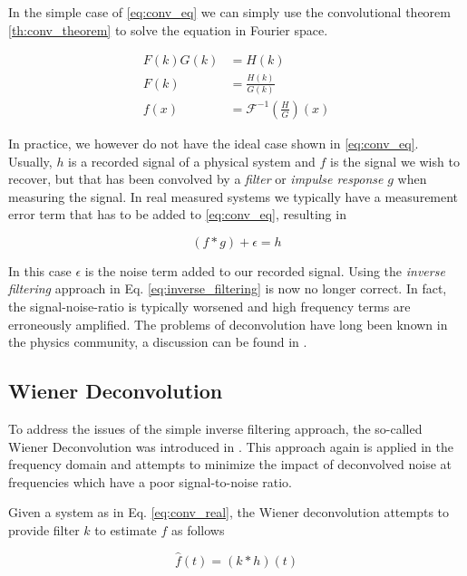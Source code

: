 In the simple case of \ref{eq:conv_eq} we can simply use the convolutional theorem \ref{th:conv_theorem} to solve the equation in Fourier space.

\begin{align}
    F(k) G(k) &= H(k) \\
    F(k) &= \frac{H(k)}{G(k)} \\
    f(x) &= \mathscr{F}^{-1}\left(\frac{H}{G}\right)(x) \label{eq:inverse_filtering}
\end{align}

In practice, we however do not have the ideal case shown in \ref{eq:conv_eq}. Usually, $h$ is a recorded signal of a physical system and $f$
is the signal we wish to recover, but that has been convolved by a \textit{filter} or \textit{impulse response} $g$ when measuring the signal.
In real measured systems we typically have a measurement error term that has to be added to \ref{eq:conv_eq}, resulting in 

\begin{equation}
    (f \ast g) + \epsilon = h
    \label{eq:conv_real} 
\end{equation}

In this case $\epsilon$ is the noise term added to our recorded signal. Using the \textit{inverse filtering} approach in Eq. \ref{eq:inverse_filtering}
is now no longer correct. In fact, the signal-noise-ratio is typically worsened and high frequency terms are erroneously amplified. The problems
of deconvolution have long been known in the physics community, a discussion can be found in \cite{jones1970problem}.

\subsection{Wiener Deconvolution} \label{sec:Wiener_deconv}

To address the issues of the simple inverse filtering approach, the so-called Wiener Deconvolution was introduced in \cite{wiener1964extrapolation}. 
This approach again is applied in the frequency domain and attempts to minimize the impact of deconvolved noise at frequencies which have a poor
signal-to-noise ratio.

Given a system as in Eq. \ref{eq:conv_real}, the Wiener deconvolution attempts to provide filter $k$ to estimate $f$ as follows

\begin{equation}
    \hat{f}(t) = (k \ast h)(t)
\end{equation}

